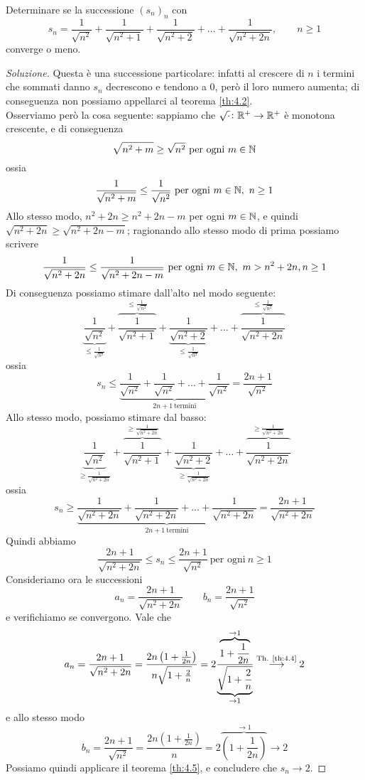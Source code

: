 \begin{exercise}
    \label{ex:4.7}
    Determinare se la successione $(s_n)_n$ con
    \[
    s_n = \frac{1}{\sqrt{n^2}}+\frac{1}{\sqrt{n^2+1}} + \frac{1}{\sqrt{n^2+2}} + \dots + \frac{1}{\sqrt{n^2+2n}}, \qquad n\ge 1
    \]
    converge o meno.
\end{exercise}
\begin{proof}[Soluzione]
    Questa è una successione particolare: infatti al crescere di $n$ i termini che sommati danno $s_n$ decrescono e tendono a $0$, però il loro numero aumenta; di conseguenza non possiamo appellarci al teorema \ref{th:4.2}.\\
    Osserviamo però la cosa seguente: sappiamo che $\sqrt{\cdot}\colon \amsbb{R}^+ \to \amsbb{R}^+$ è monotona crescente, e di conseguenza
    \[
    \sqrt{n^2 + m} \ge \sqrt{n^2}\ \text{per ogni} \ m\in\amsbb{N}
    \]
    ossia
    \[
    \frac{1}{\sqrt{n^2+m}}\le \frac{1}{\sqrt{n^2}} \ \text{per ogni} \ m\in\amsbb{N}, \ n\ge 1
    \]
    Allo stesso modo, $n^2 + 2n \ge n^2 +2n -m$ per ogni $m\in\amsbb{N}$, e quindi $\sqrt{n^2+2n}\ge \sqrt{n^2+2n-m}$; ragionando allo stesso modo di prima possiamo scrivere
    \[
    \frac{1}{\sqrt{n^2+2n}}\le \frac{1}{\sqrt{n^2+2n-m}} \ \text{per ogni} \ m\in\amsbb{N}, \ m>n^2+2n, n \ge 1 
    \]
    Di conseguenza possiamo stimare dall'alto nel modo seguente:
    \[
    \underbrace{\frac{1}{\sqrt{n^2}}}_{\le \frac{1}{\sqrt{n^2}}}+\overbrace{\frac{1}{\sqrt{n^2+1}}}^{\le \frac{1}{\sqrt{n^2}}} + \underbrace{\frac{1}{\sqrt{n^2+2}}}_{\le \frac{1}{\sqrt{n^2}}} + \dots + \overbrace{\frac{1}{\sqrt{n^2+2n}}}^{\le \frac{1}{\sqrt{n^2}}}
    \]
    ossia
    \[
    s_n \le \underbrace{\frac{1}{\sqrt{n^2}} + \frac{1}{\sqrt{n^2}} + \dots + \frac{1}{\sqrt{n^2}}}_{2n+1 \ \text{termini}} = \frac{2n+1}{\sqrt{n^2}}
    \]
    Allo stesso modo, possiamo stimare dal basso:
    \[
    \underbrace{\frac{1}{\sqrt{n^2}}}_{\ge \frac{1}{\sqrt{n^2+2n}}}+\overbrace{\frac{1}{\sqrt{n^2+1}}}^{\ge \frac{1}{\sqrt{n^2+2n}}} + \underbrace{\frac{1}{\sqrt{n^2+2}}}_{\ge \frac{1}{\sqrt{n^2+2n}}} + \dots + \overbrace{\frac{1}{\sqrt{n^2+2n}}}^{\ge \frac{1}{\sqrt{n^2+2n}}}
    \]
    ossia
    \[
    s_n \ge \underbrace{\frac{1}{\sqrt{n^2+2n}} + \frac{1}{\sqrt{n^2+2n}} + \dots + \frac{1}{\sqrt{n^2+2n}}}_{2n+1 \ \text{termini}} = \frac{2n+1}{\sqrt{n^2+2n}}
    \]
    Quindi abbiamo
    \[
    \frac{2n+1}{\sqrt{n^2+2n}} \le s_n \le \frac{2n+1}{\sqrt{n^2}} \ \text{per ogni} \ n\ge 1
    \]
    Consideriamo ora le successioni
    \[
    a_n = \frac{2n+1}{\sqrt{n^2+2n}} \qquad b_n = \frac{2n+1}{\sqrt{n^2}}
    \]
    e verifichiamo se convergono. Vale che
    \[
    a_n = \frac{2n+1}{\sqrt{n^2+2n}} = \frac{2n\left(1+\frac{1}{2n}\right)}{n\sqrt{1+\frac{2}{n}}} = 2 \frac{\overbrace{1+\frac{1}{2n}}^{\to 1}}{\underbrace{\sqrt{1+\frac{2}{n}}}_{\to 1}} \overset{\text{Th. \ref{th:4.4}}}{\longrightarrow} 2
    \]
    e allo stesso modo
    \[
    b_n = \frac{2n+1}{\sqrt{n^2}} = \frac{2n\left(1+\frac{1}{2n}\right)}{n} = 2 \overbrace{\left(1+\frac{1}{2n}\right)}^{\to 1}{\longrightarrow} 2
    \]
    Possiamo quindi applicare il teorema \ref{th:4.5}, e concludere che $s_n \to 2$.
\end{proof}
